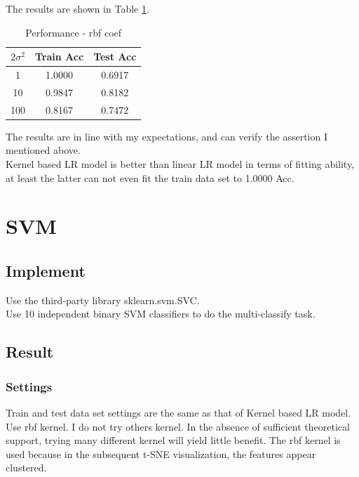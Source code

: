 \documentclass{article}
\begin{document}
The results are shown in Table \ref{kernellr}.
\begin{table}[H]
    \centering
    \caption{Performance - rbf coef}
    \label{kernellr}
    \begin{tabular}{c|cc}
        \hline
        $2\sigma^2$ & Train Acc & Test Acc\\ 
        \hline
        1 & 1.0000 & 0.6917\\
        10 & 0.9847 & 0.8182\\
        100 & 0.8167 & 0.7472\\
        \hline
    \end{tabular}
\end{table}
The results are in line with my expectations, and can verify the assertion I mentioned above.\\
Kernel based LR model is better than linear LR model in terms of fitting ability, at least the latter can not even fit the train data set to 1.0000 Acc.

\section{SVM}
\subsection{Implement}
Use the third-party library sklearn.svm.SVC.\\
Use 10 independent binary SVM classifiers to do the multi-classify task.
\subsection{Result}
\subsubsection{Settings}
Train and test data set settings are the same as that of Kernel based LR model.\\
Use rbf kernel. I do not try others kernel. In the absence of sufficient theoretical support, trying many different kernel will yield little benefit. The rbf kernel is used because in the subsequent t-SNE visualization, the features appear clustered.
\end{document}
